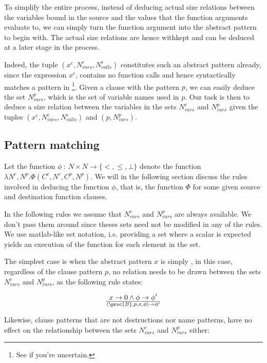 To simplify the entire process, instead of deducing actual size relations
between the variables bound in the source and the values that the function
arguments evaluate to, we can simply turn the function argument into the
abstract pattern to begin with. The actual size relations are hence withkept
and can be deduced at a later stage in the process.

Indeed, the tuple $(x^c,N_{vars}^c,N_{calls}^c)$ constitutes such an abstract
pattern already, since the expression $x^c$, contains no function calls and
hence syntactically matches a pattern in \D{}\footnote{See
 if you're uncertain.}. Given a clause with the
pattern $p$, we can easily deduce the set $N_{vars}^p$, which is the set of
variable names used in $p$. Our task is then to deduce a size relation between
the variables in the sets $N_{vars}^c$ and $N_{vars}^p$ given the tuples
$(x^c,N_{vars}^c,N_{calls}^c)$ and $(p,N_{vars}^p)$. 

\subsection{Pattern matching}

Let the function $\phi\ :\ N \times N \rightarrow \{<,\leq,\bot\}$ denote the
function $\lambda N^c, N^p . \Phi\left(C^c,N^c,C^p,N^p\right)$. We will in the
following section discuss the rules involved in deducing the function $\phi$,
that is, the function $\Phi$ for some given source and destination function
clauses.

In the following rules we assume that $N_{vars}^c$ and $N_{vars}^p$ are always
available. We don't pass them around since theses sets need not be modified in
any of the rules. We use matlab-like set notation, i.e. providing a set where a
scalar is expected yields an execution of the function for each element in the
set.

The simplest case is when the abstract pattern $x$ is simply , in this
case, regardless of the clause pattern $p$, no relation needs to be drawn
between the sets $N_{vars}^c$ and $N_{vars}^p$, as the following rule states:

\begin{equation}
{
    x\rightarrow 0
  \wedge
    \phi\rightarrow\phi'
}\over{
  \left\langle\proc{B},p,x,\phi\right\rangle
  \rightarrow
  \phi'
}
\end{equation}

Likewise, clause patterns that are not destructions nor name patterns, have no
effect on the relationship between the sets $N_{vars}^c$ and $N_{vars}^p$
either:

